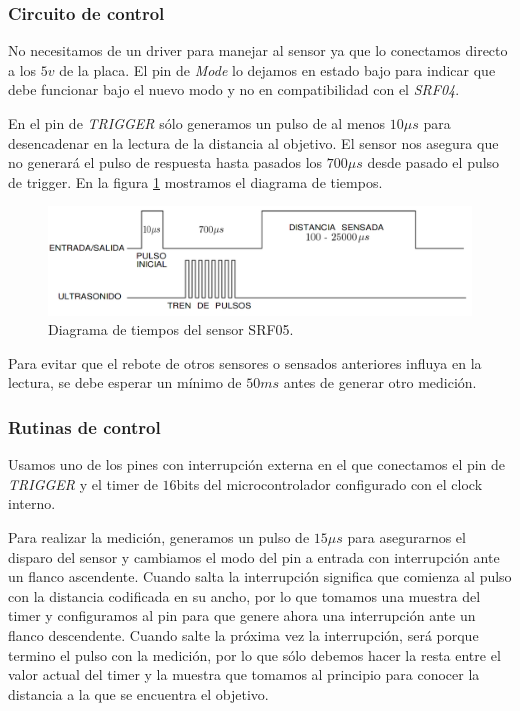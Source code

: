 \subsubsection{Circuito de control}
\label{h_sensado_ultrasonido_circuito}

No necesitamos de un driver para manejar al sensor ya que lo conectamos directo a los $5v$ de la placa.
El pin de \emph{Mode} lo dejamos en estado bajo para indicar que debe funcionar bajo el nuevo modo y no en compatibilidad con el \emph{SRF04}.

En el pin de \emph{TRIGGER} s\'olo generamos un pulso de al menos $10\mu s$ para desencadenar en la lectura de la distancia al objetivo.
El sensor nos asegura que no generar\'a el pulso de respuesta hasta pasados los $700\mu s$ desde pasado el pulso de trigger.
En la figura \ref{hF_srf05_pulse} mostramos el diagrama de tiempos.

\begin{figure}[ht]
	\centering
	\includegraphics[scale=0.25]{srf05_pulse.png}
	\caption{Diagrama de tiempos del sensor SRF05.}
	\label{hF_srf05_pulse}
\end{figure}

Para evitar que el rebote de otros sensores o sensados anteriores influya en la lectura, se debe esperar un m\'inimo de $50ms$ antes de
generar otro medici\'on.

\subsubsection{Rutinas de control}
\label{h_sensado_ultrasonido_rutinas}

Usamos uno de los pines con interrupci\'on externa en el que conectamos el pin de \emph{TRIGGER} y el timer de $16$bits del microcontrolador
configurado con el clock interno.

Para realizar la medici\'on, generamos un pulso de $15\mu s$ para asegurarnos el disparo del sensor y cambiamos el modo del pin a entrada con
interrupci\'on ante un flanco ascendente.
Cuando salta la interrupci\'on significa que comienza al pulso con la distancia codificada en su ancho, por lo que tomamos una muestra del
timer y configuramos al pin para que genere ahora una interrupci\'on ante un flanco descendente.
Cuando salte la pr\'oxima vez la interrupci\'on, ser\'a porque termino el pulso con la medici\'on, por lo que s\'olo debemos hacer la resta
entre el valor actual del timer y la muestra que tomamos al principio para conocer la distancia a la que se encuentra el objetivo.

